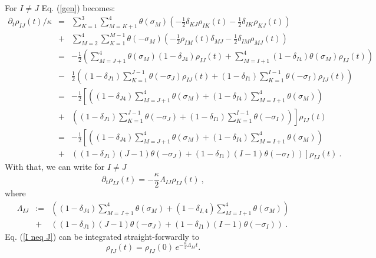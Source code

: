 \documentclass[11pt,twoside,A4]{article}
\def\beqn{\begin{eqnarray}}
\def\eeqn{\end{eqnarray}}
\begin{document}
For $I\neq J$ Eq. (\ref{gen}) becomes:
\beqn
\partial_{t}\rho_{IJ}(t)/\kappa &=& \sum_{K=1}^{3}\sum_{M=K+1}^{4}\theta(\sigma_{M})\left(-\frac{1}{2}\delta_{KJ}\rho_{IK}(t)-\frac{1}{2}\delta_{IK}\rho_{KJ}(t)\right) \nonumber \\
&+&\sum_{M=2}^{4}\sum_{K=1}^{M-1}\theta(-\sigma_{M})\left(-\frac{1}{2}\rho_{IM}(t)\delta_{MJ}-\frac{1}{2}\delta_{IM}\rho_{MJ}(t)\right) \nonumber \\
&=&-\frac{1}{2}\left(\sum_{M=J+1}^{4}\theta(\sigma_{M})(1-\delta_{J4})\rho_{IJ}(t)+\sum_{M=I+1}^{4}(1-\delta_{I4})\theta(\sigma_{M})\rho_{IJ}(t)\right)\nonumber \\
&-&\frac{1}{2}\left((1-\delta_{J1})\sum_{K=1}^{J-1}\theta(-\sigma_{J})\rho_{IJ}(t)+(1-\delta_{I1})\sum_{K=1}^{I-1}\theta(-\sigma_{I})\rho_{IJ}(t)\right)\nonumber \\
&=&-\frac{1}{2}\left[\left((1-\delta_{J4})\sum_{M=J+1}^{4}\theta(\sigma_{M})+(1-\delta_{I4})\sum_{M=I+1}^{4}\theta(\sigma_{M})\right) \right. \nonumber \\
&+& \left. \left((1-\delta_{J1})\sum_{K=1}^{J-1}\theta(-\sigma_{J})+(1-\delta_{I1})\sum_{K=1}^{I-1}\theta(-\sigma_{I})\right)\right]\rho_{IJ}(t)\nonumber \\
&=&-\frac{1}{2}\left[\left((1-\delta_{J4})\sum_{M=J+1}^{4}\theta(\sigma_{M})+(1-\delta_{I4})\sum_{M=I+1}^{4}\theta(\sigma_{M})\right) \right. \nonumber \\
&+&\left. \left((1-\delta_{J1})(J-1)\theta(-\sigma_{J})+(1-\delta_{I1})(I-1)\theta(-\sigma_{I})\right)\right]\rho_{IJ}(t)~.
\eeqn
With that, we can write 
for $I\neq J$
\begin{equation}
\partial_{t}\rho_{IJ}(t)=-\frac{\kappa}{2}\Lambda_{IJ}\rho_{IJ}(t)~,\label{I neq J}
\end{equation}
where
\beqn
\Lambda_{IJ} &:=&\left((1-\delta_{J4})\sum_{M=J+1}^{4}\theta(\sigma_{M})+(1-\delta_{I,4})\sum_{M=I+1}^{4}\theta(\sigma_{M})\right) \nonumber \\
&+&\left((1-\delta_{J1})(J-1)\theta(-\sigma_{J})+(1-\delta_{I1})(I-1)\theta(-\sigma_{I})\right)~.
\eeqn
Eq. (\ref{I neq J}) can be integrated straight-forwardly to
\begin{equation}
\rho_{IJ}(t)=\rho_{IJ}(0)\,e^{-\frac{\kappa}{2}\Lambda_{IJ}t}.\label{Sol I neq J}
\end{equation}
\end{document}
